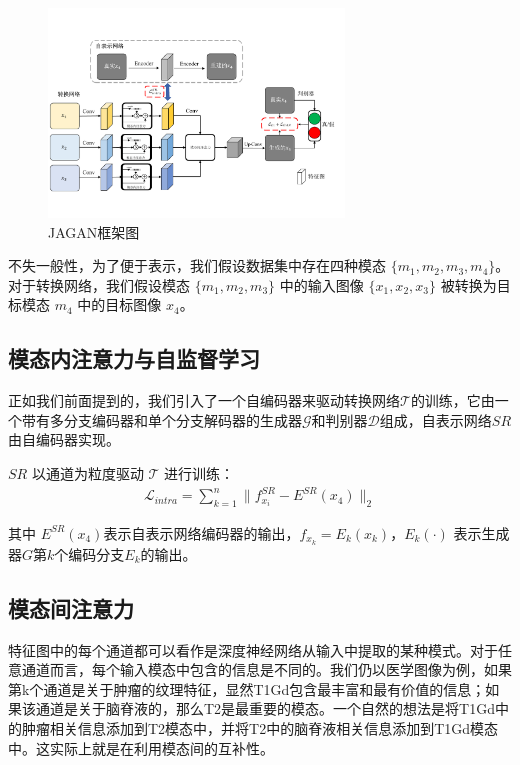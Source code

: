 \begin{figure}
    \centering
    \includegraphics[width=0.7\textwidth]{figures/JAGAN/framework.pdf}
    \caption[aaa]{JAGAN框架图}
    \label{f1}
\end{figure}

不失一般性，为了便于表示，我们假设数据集中存在四种模态 $\{m_1, m_2, m_3, m_4\}$。对于转换网络，我们假设模态 $\{m_1, m_2, m_3\}$ 中的输入图像 $\{x_1, x_2, x_3\}$ 被转换为目标模态 $m_4$ 中的目标图像 $x_4$。

\subsection{模态内注意力与自监督学习}

正如我们前面提到的，我们引入了一个自编码器来驱动转换网络$\mathcal{T}$的训练，它由一个带有多分支编码器和单个分支解码器的生成器$\mathcal{G}$和判别器$\mathcal{D}$组成，自表示网络$SR$由自编码器实现。

$SR$ 以通道为粒度驱动 $\mathcal{T}$ 进行训练：
\begin{align}
	\mathcal{L}_{intra} = \sum_{k=1}^n \|f^{SR}_{x_i}- E^{SR}(x_4)\|_2
\end{align}

其中 $E^{SR}(x_4)$表示自表示网络编码器的输出，$f_{x_k}=E_k(x_k)$，$E_k(\cdot)$ 表示生成器$G$第$k$个编码分支$E_k$的输出。

\subsection{模态间注意力}

特征图中的每个通道都可以看作是深度神经网络从输入中提取的某种模式。对于任意通道而言，每个输入模态中包含的信息是不同的。我们仍以医学图像为例，如果第k个通道是关于肿瘤的纹理特征，显然T1Gd包含最丰富和最有价值的信息；如果该通道是关于脑脊液的，那么T2是最重要的模态。一个自然的想法是将T1Gd中的肿瘤相关信息添加到T2模态中，并将T2中的脑脊液相关信息添加到T1Gd模态中。这实际上就是在利用模态间的互补性。

